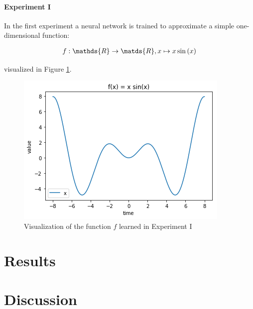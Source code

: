 \documentclass[10pt,a4paper,twocolumn]{article}
\begin{document}
\paragraph{Experiment I} In the first experiment a neural network is trained to approximate a simple one-dimensional function:

\begin{align}
f: \mathds{R} \to \matds{R}, x \mapsto x\sin{(x)}
\end{align}

visualized in Figure \ref{fig:exp1_func}.

\begin{figure}
\centering
\includegraphics[width=\linewidth]{function.png}
\caption{Visualization of the function $f$ learned in Experiment I}\label{fig:exp1_func}
\end{figure}
\section{Results}

\section{Discussion}


\end{document}
